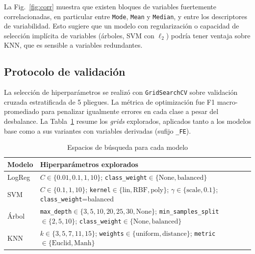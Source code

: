 \documentclass[conference]{IEEEtran}
\begin{document}
La Fig.~\ref{fig:corr} muestra que existen bloques de variables fuertemente correlacionadas, en particular entre \texttt{Mode}, \texttt{Mean} y \texttt{Median}, y entre los descriptores de variabilidad. Esto sugiere que un modelo con regularizaci\'on o capacidad de selecci\'on impl\'icita de variables (\'arboles, SVM con $\ell_2$) podr\'ia tener ventaja sobre KNN, que es sensible a variables redundantes.

\subsection{Protocolo de validaci\'on}
La selecci\'on de hiperpar\'ametros se realiz\'o con \texttt{GridSearchCV} sobre validaci\'on cruzada estratificada de 5 pliegues. La m\'etrica de optimizaci\'on fue F1 macro-promediado para penalizar igualmente errores en cada clase a pesar del desbalance. La Tabla~\ref{tab:grids} resume los \emph{grids} explorados, aplicados tanto a los modelos base como a sus variantes con variables derivadas (sufijo \texttt{\_FE}).

\begin{table}[!t]
\caption{Espacios de b\'usqueda para cada modelo}
\label{tab:grids}
\centering
\renewcommand{\arraystretch}{1.2}
\begin{tabular}{lp{5.1cm}}
\toprule
\textbf{Modelo} & \textbf{Hiperpar\'ametros explorados} \\
\midrule
LogReg & $C\in\{0.01,0.1,1,10\}$; \texttt{class\_weight}$\in\{\text{None},\text{balanced}\}$ \\
SVM    & $C\in\{0.1,1,10\}$; \texttt{kernel}$\in\{\text{lin},\text{RBF},\text{poly}\}$; $\gamma\in\{\text{scale},0.1\}$; \texttt{class\_weight}=balanced \\
\'Arbol & \texttt{max\_depth}$\in\{3,5,10,20,25,30,\text{None}\}$; \texttt{min\_samples\_split}$\in\{2,5,10\}$; \texttt{class\_weight}$\in\{\text{None},\text{balanced}\}$ \\
KNN    & $k\in\{3,5,7,11,15\}$; \texttt{weights}$\in\{\text{uniform},\text{distance}\}$; \texttt{metric}$\in\{\text{Euclid},\text{Manh}\}$ \\
\bottomrule
\end{tabular}
\end{table}
\end{document}
